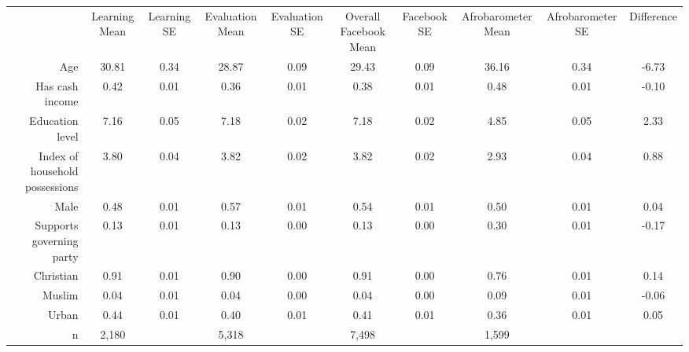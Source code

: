 
\begin{tabular}[t]{rcccc|ccccc}
 & Learning Mean & Learning SE & Evaluation Mean & Evaluation SE & Overall Facebook Mean & Facebook SE & Afrobarometer Mean & Afrobarometer SE & Difference\\
\cmidrule(lr){2-2}  \cmidrule(lr){3-3}  \cmidrule(lr){4-4} \cmidrule(lr){5-5} \cmidrule(lr){6-6} \cmidrule(lr){7-7} \cmidrule(lr){8-8} \cmidrule(lr){9-9} \cmidrule(lr){10-10}
Age & 30.81 & 0.34 & 28.87 & 0.09 & 29.43 & 0.09 & 36.16 & 0.34 & -6.73\\
Has cash income & 0.42 & 0.01 & 0.36 & 0.01 & 0.38 & 0.01 & 0.48 & 0.01 & -0.10\\
Education level & 7.16 & 0.05 & 7.18 & 0.02 & 7.18 & 0.02 & 4.85 & 0.05 & 2.33\\
Index of household possessions & 3.80 & 0.04 & 3.82 & 0.02 & 3.82 & 0.02 & 2.93 & 0.04 & 0.88\\
Male & 0.48 & 0.01 & 0.57 & 0.01 & 0.54 & 0.01 & 0.50 & 0.01 & 0.04\\
Supports governing party & 0.13 & 0.01 & 0.13 & 0.00 & 0.13 & 0.00 & 0.30 & 0.01 & -0.17\\
Christian & 0.91 & 0.01 & 0.90 & 0.00 & 0.91 & 0.00 & 0.76 & 0.01 & 0.14\\
Muslim & 0.04 & 0.01 & 0.04 & 0.00 & 0.04 & 0.00 & 0.09 & 0.01 & -0.06\\
Urban & 0.44 & 0.01 & 0.40 & 0.01 & 0.41 & 0.01 & 0.36 & 0.01 & 0.05\\
n & 2,180 &   & 5,318 &   & 7,498 &  & 1,599 &   &  
\end{tabular}
